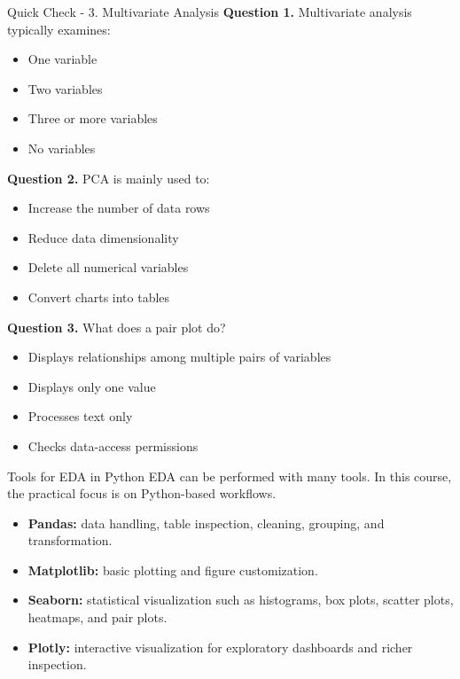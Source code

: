 \documentclass[aspectratio=169,11pt]{beamer}
\begin{document}
\begin{frame}[allowframebreaks]{Quick Check - 3. Multivariate Analysis}
\footnotesize
\textbf{Question 1.} Multivariate analysis typically examines:\par\medskip
\begin{itemize}
\item[\textbf{A.}] One variable
\item[\textbf{B.}] Two variables
\item[\textbf{C.}] Three or more variables
\item[\textbf{D.}] No variables
\end{itemize}
\textbf{Question 2.} PCA is mainly used to:\par\medskip
\begin{itemize}
\item[\textbf{A.}] Increase the number of data rows
\item[\textbf{B.}] Reduce data dimensionality
\item[\textbf{C.}] Delete all numerical variables
\item[\textbf{D.}] Convert charts into tables
\end{itemize}
\textbf{Question 3.} What does a pair plot do?\par\medskip
\begin{itemize}
\item[\textbf{A.}] Displays relationships among multiple pairs of variables
\item[\textbf{B.}] Displays only one value
\item[\textbf{C.}] Processes text only
\item[\textbf{D.}] Checks data-access permissions
\end{itemize}
\end{frame}

\begin{frame}[allowframebreaks]{Tools for EDA in Python}
\small
EDA can be performed with many tools. In this course, the practical focus is on Python-based workflows.\par\medskip
\begin{itemize}
\item \textbf{Pandas:} data handling, table inspection, cleaning, grouping, and transformation.
\item \textbf{Matplotlib:} basic plotting and figure customization.
\item \textbf{Seaborn:} statistical visualization such as histograms, box plots, scatter plots, heatmaps, and pair plots.
\item \textbf{Plotly:} interactive visualization for exploratory dashboards and richer inspection.
\end{itemize}
\end{frame}
\end{document}
